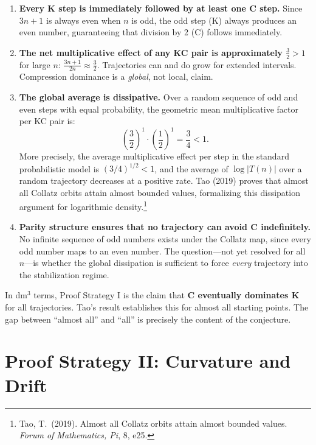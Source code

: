 \documentclass[14pt, twoside, openright]{book}
\theoremstyle{definition}
\theoremstyle{remark}
\begin{document}
\begin{enumerate}[leftmargin=2em]
  \item \textbf{Every K step is immediately followed by at least one C step.}
        Since $3n+1$ is always even when $n$ is odd, the odd step (K) always
        produces an even number, guaranteeing that division by 2 (C) follows
        immediately.

  \item \textbf{The net multiplicative effect of any KC pair is approximately
        $\tfrac{3}{2} > 1$} for large $n$: $\displaystyle\frac{3n+1}{2n}
        \approx \frac{3}{2}$. Trajectories can and do grow for extended
        intervals. Compression dominance is a \textit{global}, not local, claim.

  \item \textbf{The global average is dissipative.} Over a random sequence of
        odd and even steps with equal probability, the geometric mean multiplicative
        factor per KC pair is:
        \[
          \left(\frac{3}{2}\right)^{1} \cdot \left(\frac{1}{2}\right)^{1}
          = \frac{3}{4} < 1.
        \]
        More precisely, the average multiplicative effect per step in the standard
        probabilistic model is $(3/4)^{1/2} < 1$, and the average of
        $\log|T(n)|$ over a random trajectory decreases at a positive rate.
        Tao (2019) proves that almost all Collatz orbits attain almost bounded
        values, formalizing this dissipation argument for logarithmic density.\footnote{Tao,
        T.\ (2019). Almost all Collatz orbits attain almost bounded values.
        \textit{Forum of Mathematics, Pi}, 8, e25.}

  \item \textbf{Parity structure ensures that no trajectory can avoid C
        indefinitely.} No infinite sequence of odd numbers exists under the
        Collatz map, since every odd number maps to an even number. The
        question---not yet resolved for all $n$---is whether the global
        dissipation is sufficient to force \textit{every} trajectory into the
        stabilization regime.
\end{enumerate}

\medskip
In dm$^{3}$ terms, Proof Strategy I is the claim that \textbf{C eventually
dominates K} for all trajectories. Tao's result establishes this for almost all
starting points. The gap between ``almost all'' and ``all'' is precisely the
content of the conjecture.

\section{Proof Strategy II: Curvature and Drift}
\end{document}

